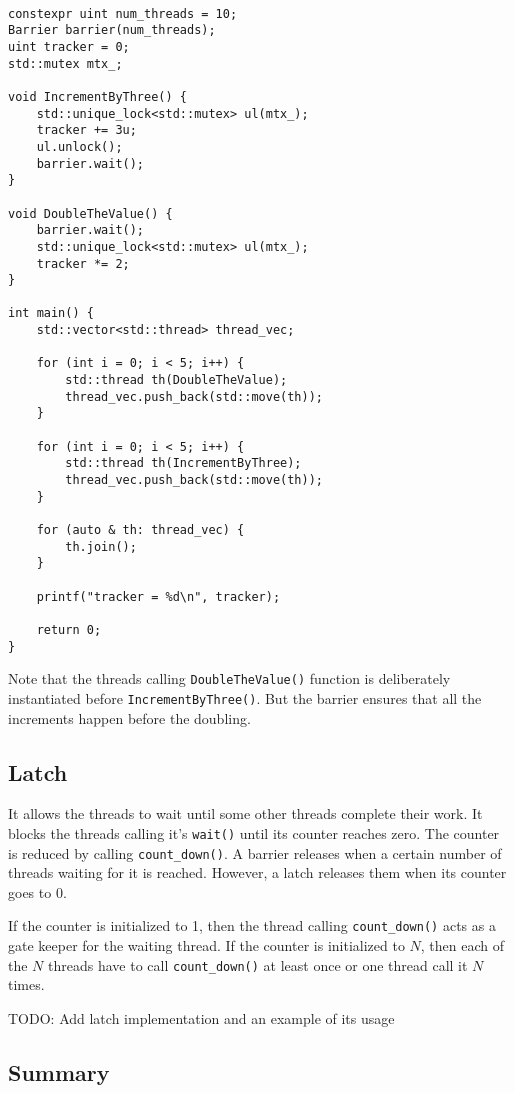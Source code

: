 \documentclass{scrartcl}
\begin{document}
\begin{verbatim}

constexpr uint num_threads = 10;
Barrier barrier(num_threads);
uint tracker = 0;
std::mutex mtx_;

void IncrementByThree() {
    std::unique_lock<std::mutex> ul(mtx_);
    tracker += 3u;
    ul.unlock();
    barrier.wait();
}

void DoubleTheValue() {
    barrier.wait();
    std::unique_lock<std::mutex> ul(mtx_);
    tracker *= 2;
}

int main() {
    std::vector<std::thread> thread_vec;

    for (int i = 0; i < 5; i++) {
        std::thread th(DoubleTheValue);
        thread_vec.push_back(std::move(th));
    }

    for (int i = 0; i < 5; i++) {
        std::thread th(IncrementByThree);
        thread_vec.push_back(std::move(th));
    }

    for (auto & th: thread_vec) {
        th.join();
    }

    printf("tracker = %d\n", tracker);

    return 0;
}
\end{verbatim}

Note that the threads calling \texttt{DoubleTheValue()} function is deliberately instantiated before \texttt{IncrementByThree()}. But the barrier ensures that all the increments happen before the doubling.

\subsection{Latch}
It allows the threads to wait until some other threads complete their work. It blocks the threads calling it's \texttt{wait()} until its counter reaches zero. The counter is reduced by calling \texttt{count_down()}. A barrier releases when a certain number of threads waiting for it is reached. However, a latch releases them when its counter goes to 0. 

If the counter is initialized to 1, then the thread calling \texttt{count_down()} acts as a gate keeper for the waiting thread. If the counter is initialized to $N$, then each of the $N$ threads have to call \texttt{count_down()} at least once or one thread call it $N$ times.

TODO: Add latch implementation and an example of its usage

\subsection{Summary}
\end{document}
